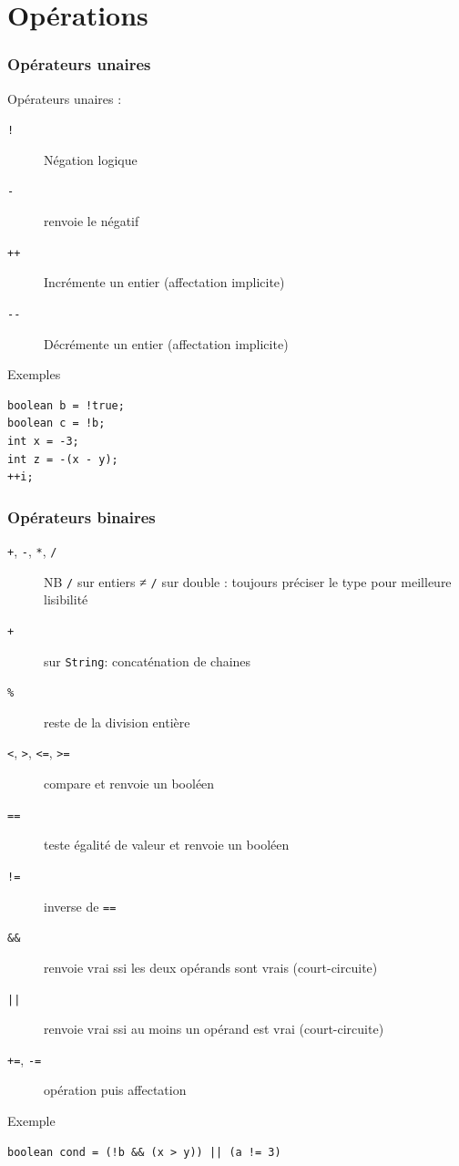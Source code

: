 \documentclass[english, french]{beamer}
\begin{document}
\section{Opérations}
\begin{frame}[fragile]
	\frametitle{Opérateurs unaires}
	Opérateurs unaires :
	\begin{description}
		\item[\texttt{!}] Négation logique
		\item[\texttt{-}] renvoie le négatif
		\item[\texttt{++}] Incrémente un entier (affectation implicite)
		\item[\texttt{-{}-}] Décrémente un entier (affectation implicite)
	\end{description}
	\begin{block}{Exemples}
		\begin{lstlisting}
boolean b = !true;
boolean c = !b;
int x = -3;
int z = -(x - y);
++i;
		\end{lstlisting}	
	\end{block}
\end{frame}

\begin{frame}[fragile]
	\frametitle{Opérateurs binaires}
	\begin{description}
		\item[\texttt{+}, \texttt{-}, \texttt{*}, \texttt{/}] NB \texttt{/} sur entiers ≠ \texttt{/} sur double : toujours préciser le type pour meilleure lisibilité
		\item[\texttt{+}] sur \texttt{String}: concaténation de chaines
		\item[\texttt{\%}] reste de la division entière
		\item[\texttt{<}, \texttt{>}, \texttt{<=}, \texttt{>=}] compare et renvoie un booléen
		\item[\texttt{==}] teste égalité de valeur et renvoie un booléen
		\item[\texttt{!=}] inverse de \texttt{==}
		\item[\texttt{\&\&}] renvoie vrai ssi les deux opérands sont vrais {\tiny (court-circuite)}
		\item[\texttt{||}] renvoie vrai ssi au moins un opérand est vrai {\tiny (court-circuite)}
		\item[\texttt{+=}, \texttt{-=}] opération puis affectation
	\end{description}
	\begin{block}{Exemple}
		\begin{lstlisting}
boolean cond = (!b && (x > y)) || (a != 3)
		\end{lstlisting}	
	\end{block}
\end{frame}
\end{document}
